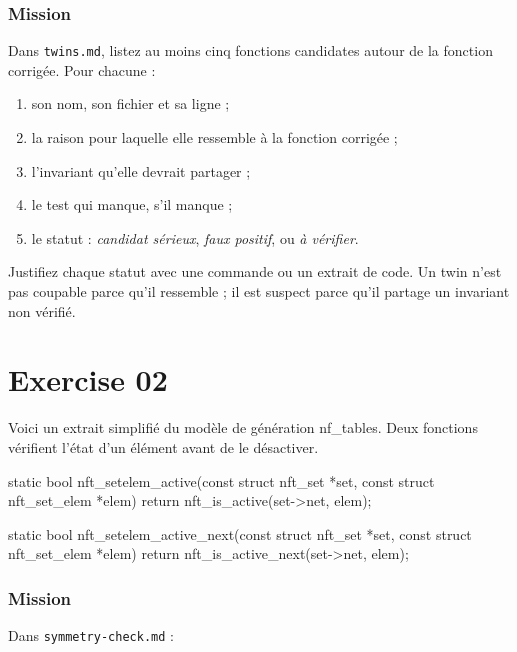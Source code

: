 \documentclass{training}
\begin{document}
\subsection*{Mission}

Dans \texttt{twins.md}, listez au moins cinq fonctions candidates autour de
la fonction corrigée. Pour chacune :

\begin{enumerate}
  \item son nom, son fichier et sa ligne ;
  \item la raison pour laquelle elle ressemble à la fonction corrigée ;
  \item l'invariant qu'elle devrait partager ;
  \item le test qui manque, s'il manque ;
  \item le statut : \emph{candidat sérieux}, \emph{faux positif}, ou
        \emph{à vérifier}.
\end{enumerate}

Justifiez chaque statut avec une commande ou un extrait de code. Un twin
n'est pas coupable parce qu'il ressemble ; il est suspect parce qu'il
partage un invariant non vérifié.

\chapter{Exercise 02}
\makeheaderfiles

Voici un extrait simplifié du modèle de génération nf\_tables. Deux
fonctions vérifient l'état d'un élément avant de le désactiver.

\begin{console}
static bool nft_setelem_active(const struct nft_set *set,
                               const struct nft_set_elem *elem)
{
    return nft_is_active(set->net, elem);
}

static bool nft_setelem_active_next(const struct nft_set *set,
                                    const struct nft_set_elem *elem)
{
    return nft_is_active_next(set->net, elem);
}
\end{console}

\subsection*{Mission}

Dans \texttt{symmetry-check.md} :
\end{document}
